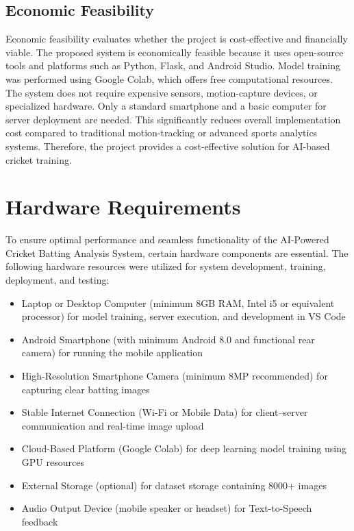 \subsection{Economic Feasibility}
Economic feasibility evaluates whether the project is cost-effective and financially viable.
The proposed system is economically feasible because it uses open-source tools and platforms such as Python, Flask, and Android Studio. Model training was performed using Google Colab, which offers free computational resources. The system does not require expensive sensors, motion-capture devices, or specialized hardware.
Only a standard smartphone and a basic computer for server deployment are needed. This significantly reduces overall implementation cost compared to traditional motion-tracking or advanced sports analytics systems. Therefore, the project provides a cost-effective solution for AI-based cricket training.
\section{Hardware Requirements}  \label{S3.4}
To ensure optimal performance and seamless functionality of the AI-Powered Cricket Batting Analysis System, certain hardware components are essential. The following hardware resources were utilized for system development, training, deployment, and testing:

\begin{itemize}	
	\item Laptop or Desktop Computer (minimum 8GB RAM, Intel i5 or equivalent processor) for model training, server execution, and development in VS Code
	\item Android Smartphone (with minimum Android 8.0 and functional rear camera) for running the mobile application
	\item High-Resolution Smartphone Camera (minimum 8MP recommended) for capturing clear batting images
	\item Stable Internet Connection (Wi-Fi or Mobile Data) for client–server communication and real-time image upload
	\item Cloud-Based Platform (Google Colab) for deep learning model training using GPU resources
	\item External Storage (optional) for dataset storage containing 8000+ images
	\item Audio Output Device (mobile speaker or headset) for Text-to-Speech feedback
\end{itemize}

